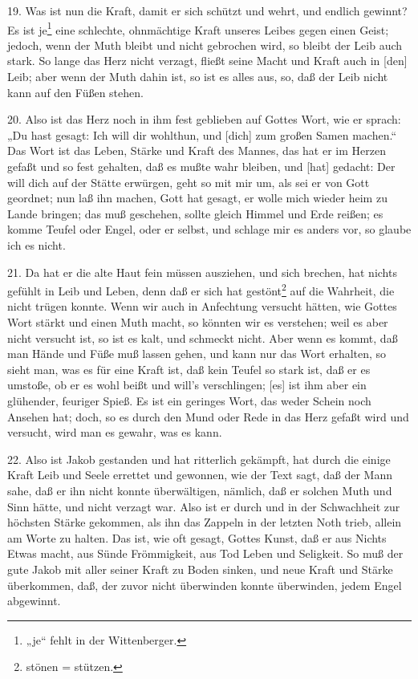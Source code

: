 19. Was ist nun die Kraft, damit er sich schützt und wehrt, und endlich gewinnt? Es ist je\footnote{„je“ fehlt in der Wittenberger.} eine schlechte, ohnmächtige Kraft unseres Leibes gegen einen Geist; jedoch, wenn der Muth bleibt und nicht gebrochen wird, so bleibt der Leib auch stark. So lange das Herz nicht verzagt, fließt seine Macht und Kraft auch in [den] Leib; aber wenn der Muth dahin ist, so ist es alles aus, so, daß der Leib nicht kann auf den Füßen stehen.

20. Also ist das Herz noch in ihm fest geblieben auf Gottes Wort, wie er sprach: „Du hast gesagt: Ich will dir wohlthun, und [dich] zum großen Samen machen.“ Das Wort ist das Leben, Stärke und Kraft des Mannes, das hat er im Herzen gefaßt und so fest gehalten, daß es mußte wahr bleiben, und [hat] gedacht: Der will dich auf der Stätte erwürgen, geht so mit mir um, als sei er von Gott geordnet; nun laß ihn machen, Gott hat gesagt, er wolle mich wieder heim zu Lande bringen; das muß geschehen, sollte gleich Himmel und Erde reißen; es komme Teufel oder Engel, oder er selbst, und schlage mir es anders vor, so glaube ich es nicht.

21. Da hat er die alte Haut fein müssen ausziehen, und sich brechen, hat nichts gefühlt in Leib und Leben, denn daß er sich hat gestönt\footnote{stönen = stützen.} auf die Wahrheit, die nicht trügen konnte. Wenn wir auch in Anfechtung versucht hätten, wie Gottes Wort stärkt und einen Muth macht, so könnten wir es verstehen; weil es aber nicht versucht ist, so ist es kalt, und schmeckt nicht. Aber wenn es kommt, daß man Hände und Füße muß lassen gehen, und kann nur das Wort erhalten, so sieht man, was es für eine Kraft ist, daß kein Teufel so stark ist, daß er es umstoße, ob er es wohl beißt und will’s verschlingen; [es] ist ihm aber ein glühender, feuriger Spieß. Es ist ein geringes Wort, das weder Schein noch Ansehen hat; doch, so es durch den Mund oder Rede in das Herz gefaßt wird und versucht, wird man es gewahr, was es kann.

22. Also ist Jakob gestanden und hat ritterlich gekämpft, hat durch die einige Kraft Leib und Seele errettet und gewonnen, wie der Text sagt, daß der Mann sahe, daß er ihn nicht konnte überwältigen, nämlich, daß er solchen Muth und Sinn hätte, und nicht verzagt war. Also ist er durch und in der Schwachheit zur höchsten Stärke gekommen, als ihn das Zappeln in der letzten Noth trieb, allein am Worte zu halten. Das ist, wie oft gesagt, Gottes Kunst, daß er aus Nichts Etwas macht, aus Sünde Frömmigkeit, aus Tod Leben und Seligkeit. So muß der gute Jakob mit aller seiner Kraft zu
Boden sinken, und neue Kraft und Stärke überkommen, daß, der zuvor nicht überwinden konnte überwinden, jedem Engel abgewinnt.

